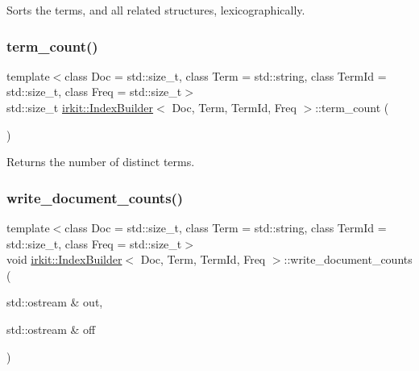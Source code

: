 Sorts the terms, and all related structures, lexicographically. 

\mbox{\label{classirkit_1_1IndexBuilder_abfd5cee3ad708bd89a0a1572479ba573}} 
\subsubsection{\texorpdfstring{term\+\_\+count()}{term\_count()}}
{\footnotesize\ttfamily template$<$class Doc  = std\+::size\+\_\+t, class Term  = std\+::string, class Term\+Id  = std\+::size\+\_\+t, class Freq  = std\+::size\+\_\+t$>$ \\
std\+::size\+\_\+t \mbox{\hyperlink{classirkit_1_1IndexBuilder}{irkit\+::\+Index\+Builder}}$<$ Doc, Term, Term\+Id, Freq $>$\+::term\+\_\+count (\begin{DoxyParamCaption}{ }\end{DoxyParamCaption})\hspace{0.3cm}{\ttfamily [inline]}}



Returns the number of distinct terms. 

\mbox{\label{classirkit_1_1IndexBuilder_aba0b947f29e491205adf3df3f862e58e}} 
\subsubsection{\texorpdfstring{write\+\_\+document\+\_\+counts()}{write\_document\_counts()}}
{\footnotesize\ttfamily template$<$class Doc  = std\+::size\+\_\+t, class Term  = std\+::string, class Term\+Id  = std\+::size\+\_\+t, class Freq  = std\+::size\+\_\+t$>$ \\
void \mbox{\hyperlink{classirkit_1_1IndexBuilder}{irkit\+::\+Index\+Builder}}$<$ Doc, Term, Term\+Id, Freq $>$\+::write\+\_\+document\+\_\+counts (\begin{DoxyParamCaption}\item[{std\+::ostream \&}]{out,  }\item[{std\+::ostream \&}]{off }\end{DoxyParamCaption})\hspace{0.3cm}{\ttfamily [inline]}}



